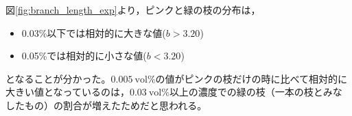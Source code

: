 \documentclass[autodetect-engine,dvi=dvipdfmx,a4paper,ja=standard,oneside,openany,11pt]{bxjsbook}
\begin{document}
図\ref{fig:branch_length_exp}より，ピンクと緑の枝の分布は，
\begin{itemize}
  \item 0.03\%以下では相対的に大きな値($b>3.20$)
  \item 0.05\%では相対的に小さな値($b<3.20$)
\end{itemize}
となることが分かった。$\SI{0.005}{\mathrm{vol}\%}$の値がピンクの枝だけの時に比べて相対的に大きい値となっているのは，$\SI{0.03}{\mathrm{vol}\%}$以上の濃度での緑の枝（一本の枝とみなしたもの）の割合が増えたためだと思われる。
\ifdraft{
  
  
}{}
\end{document}
